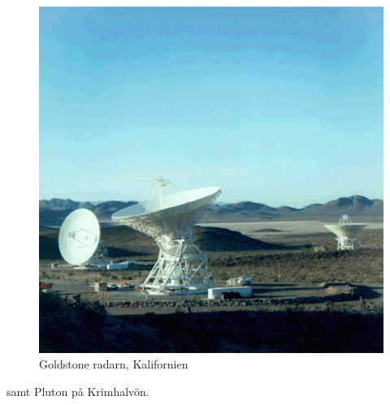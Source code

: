 \documentclass[./exercises.tex]{subfiles}
\begin{document}
 \begin{figure}[H]
\begin{center}
  \includegraphics[scale=0.25]{Goldstone_Deep_Space_Network.jpg}
  \caption{Goldstone radarn, Kalifornien}
  \end{center}
  \label{fig4}
\end{figure}

samt Pluton på Krimhalvön.
\end{document}
